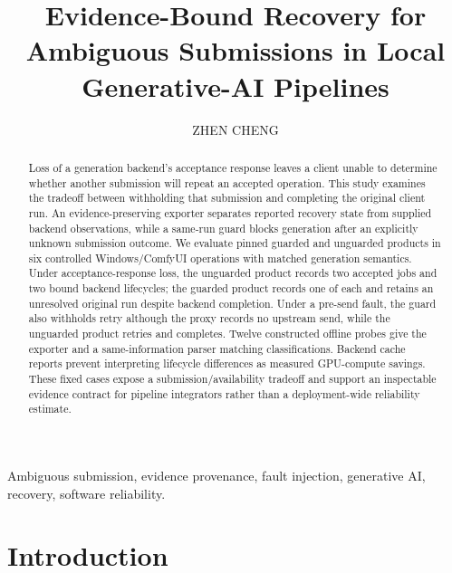 \documentclass{ieeeaccess}
\begin{document}
\title{Evidence-Bound Recovery for Ambiguous Submissions in Local Generative-AI Pipelines}
\author{\uppercase{Zhen Cheng}}
\address[1]{School of Computer Science and Technology (School of Artificial Intelligence), Zhejiang Sci-Tech University, Hangzhou, China (e-mail: ChengZhen0105@outlook.com)}
\begin{abstract}
Loss of a generation backend's acceptance response leaves a client unable to determine whether another submission will repeat an accepted operation. This study examines the tradeoff between withholding that submission and completing the original client run. An evidence-preserving exporter separates reported recovery state from supplied backend observations, while a same-run guard blocks generation after an explicitly unknown submission outcome. We evaluate pinned guarded and unguarded products in six controlled Windows/ComfyUI operations with matched generation semantics. Under acceptance-response loss, the unguarded product records two accepted jobs and two bound backend lifecycles; the guarded product records one of each and retains an unresolved original run despite backend completion. Under a pre-send fault, the guard also withholds retry although the proxy records no upstream send, while the unguarded product retries and completes. Twelve constructed offline probes give the exporter and a same-information parser matching classifications. Backend cache reports prevent interpreting lifecycle differences as measured GPU-compute savings. These fixed cases expose a submission/availability tradeoff and support an inspectable evidence contract for pipeline integrators rather than a deployment-wide reliability estimate.
\end{abstract}
\begin{keywords}
Ambiguous submission, evidence provenance, fault injection, generative AI, recovery, software reliability.
\end{keywords}
\maketitle
\section{Introduction}
\end{document}
